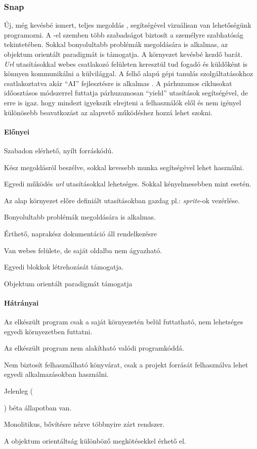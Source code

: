 \documentclass[12pt,a4paper,oneside]{report} %
\begin{document}
\subsubsection{Snap} \label{snap}Új, még kevésbé  ismert, teljes megoldás \cite{harvey2013snap}, segítségével vizuálisan van lehetőségünk programozni. A -el szemben több szabadságot biztosít a személyre szabhatóság tekintetében. Sokkal bonyolultabb problémák megoldására is alkalmas, az objektum orientált paradigmát is támogatja. A környezet kevésbé kezdő barát. \textit{Url} utasításokkal webes  csatlakozó felületen keresztül tud fogadó és küldőként is könnyen kommunikálni a külvilággal. A felhő alapú gépi tanulás szolgáltatásokhoz csatlakoztatva akár ``AI'' fejlesztésre is alkalmas \cite{kahn2018ai}. A párhuzamos ciklusokat időosztásos módszerrel futtatja párhuzamosan ``yield'' utasítások segítségével, de erre is igaz. hogy mindezt igyekszik elrejteni a felhasználók elől és nem igényel különösebb beavatkozást az alapvető működéshez hozzá lehet szokni.
\paragraph{Előnyei} 
\begin{compactitem}
	\item Szabadon elérhető, nyílt forráskódú.
	\item Kész megoldásról beszélve, sokkal kevesebb munka segítségével lehet használni.
	\item Egyedi működés \textit{url} utasításokkal lehetséges. Sokkal kényelmesebben mint  esetén.
	\item Az alap környezet előre definiált utasításokban gazdag pl.: \textit{sprite}-ok vezérlése.
	\item Bonyolultabb problémák megoldására is alkalmas.
	\item Érthető, naprakész dokumentáció áll rendelkezésre
	\item Van webes felülete, de saját oldalba nem ágyazható.
	\item Egyedi blokkok létrehozását támogatja.
	\item Objektum orientált paradigmát támogatja
\end{compactitem}
\paragraph{Hátrányai} 
\begin{compactitem}
	\item Az elkészült program csak a saját környezetén belül futtatható, nem lehetséges egyedi környezetben futtatni.
	\item Az elkészült program nem alakítható valódi programkóddá.
	\item Nem biztosít felhasználható könyvárat, csak a projekt forrását felhasználva lehet egyedi alkalmazásokban használni.
	\item Jelenleg (\date{\today}) béta állapotban van.
	\item Monolitikus, bővítésre nézve többnyire zárt rendszer.
	\item A objektum orientáltság különböző megkötésekkel érhető el.
\end{compactitem}
\end{document}
